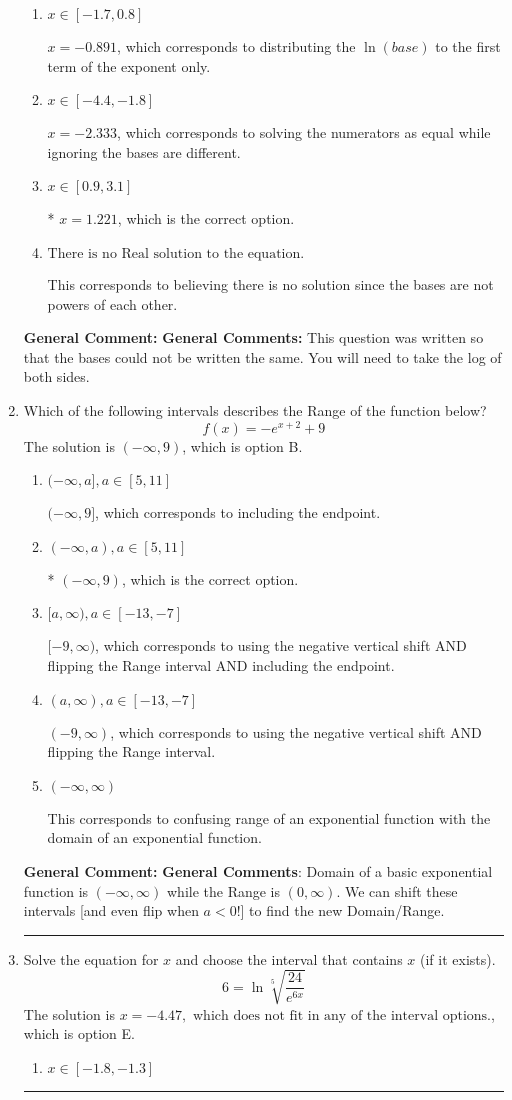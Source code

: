 \documentclass{extbook}[14pt]
\newcommand{\litem}[1]{\item #1

\rule{\textwidth}{0.4pt}}
\begin{document}
\begin{enumerate}
{\begin{enumerate}[label=\Alph*.]
$x = 3.200$, which corresponds to distributing the $\ln(base)$ to the second term of the exponent only.
\item \( x \in [-1.7, 0.8] \)

$x = -0.891$, which corresponds to distributing the $\ln(base)$ to the first term of the exponent only.
\item \( x \in [-4.4, -1.8] \)

$x = -2.333$, which corresponds to solving the numerators as equal while ignoring the bases are different.
\item \( x \in [0.9, 3.1] \)

* $x = 1.221$, which is the correct option.
\item \( \text{There is no Real solution to the equation.} \)

This corresponds to believing there is no solution since the bases are not powers of each other.
\end{enumerate}

\textbf{General Comment:} \textbf{General Comments:} This question was written so that the bases could not be written the same. You will need to take the log of both sides.
}
\litem{
Which of the following intervals describes the Range of the function below?
\[ f(x) = -e^{x+2}+9 \]
The solution is \( (-\infty, 9) \), which is option B.\begin{enumerate}[label=\Alph*.]
\item \( (-\infty, a], a \in [5, 11] \)

$(-\infty, 9]$, which corresponds to including the endpoint.
\item \( (-\infty, a), a \in [5, 11] \)

* $(-\infty, 9)$, which is the correct option.
\item \( [a, \infty), a \in [-13, -7] \)

$[-9, \infty)$, which corresponds to using the negative vertical shift AND flipping the Range interval AND including the endpoint.
\item \( (a, \infty), a \in [-13, -7] \)

$(-9, \infty)$, which corresponds to using the negative vertical shift AND flipping the Range interval.
\item \( (-\infty, \infty) \)

This corresponds to confusing range of an exponential function with the domain of an exponential function.
\end{enumerate}

\textbf{General Comment:} \textbf{General Comments}: Domain of a basic exponential function is $(-\infty, \infty)$ while the Range is $(0, \infty)$. We can shift these intervals [and even flip when $a<0$!] to find the new Domain/Range.
}
\litem{
 Solve the equation for $x$ and choose the interval that contains $x$ (if it exists).
\[  6 = \ln{\sqrt[5]{\frac{24}{e^{6x}}}} \]
The solution is \( x = -4.47, \text{ which does not fit in any of the interval options.} \), which is option E.\begin{enumerate}[label=\Alph*.]
\item \( x \in [-1.8, -1.3] \)


\end{enumerate}}
\end{enumerate}
\end{document}
